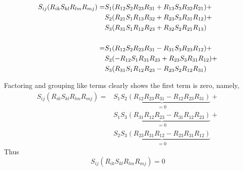 \begin{subequations}
    \begin{align}
        S_{ij}(R_{ik}S_{kl} R_{lm} R_{mj}) = &
                S_{1} ( R_{12}S_{2}R_{23}R_{31}       + R_{13} S_{3} R_{32} R_{21}) +           \notag  \\
            &   S_{2} ( R_{21} S_{1} R_{13} R_{32}    + R_{23} S_{3} R_{31} R_{12}) +                   \\
            &   S_{3} ( R_{31} S_{1} R_{12} R_{23}    + R_{32} S_{2} R_{21} R_{13})             \notag  \\
            \notag \\
            = &  
                S_{1} ( R_{12}S_{2}R_{23}R_{31}       - R_{31} S_{3} R_{23} R_{12}) +           \notag  \\
            &   S_{2} ( -R_{12} S_{1} R_{31} R_{23}   + R_{23} S_{3} R_{31} R_{12}) +                   \\
            &   S_{3} ( R_{31} S_{1} R_{12} R_{23}    - R_{23} S_{2} R_{12} R_{31})             \notag
    \end{align}
\end{subequations}

Factoring and grouping like terms clearly shows the first term is zero, namely,
\begin{equation}
    \begin{split}
        S_{ij}(R_{ik}S_{kl} R_{lm} R_{mj}) = &
            \underbrace{S_{1}S_{2}(R_{12}R_{23}R_{31} - R_{12}R_{23}R_{31})}_{=0} +   \\
        &   \underbrace{S_{1}S_{3}(R_{31}R_{12}R_{23} - R_{31}R_{12}R_{23})}_{=0} +   \\
        &   \underbrace{S_{2}S_{3}(R_{23}R_{31}R_{12} - R_{23}R_{31}R_{12})}_{=0}
    \end{split}
\end{equation}
Thus
\begin{equation}
    S_{ij}(R_{ik}S_{kl} R_{lm} R_{mj}) = 0
\end{equation}
